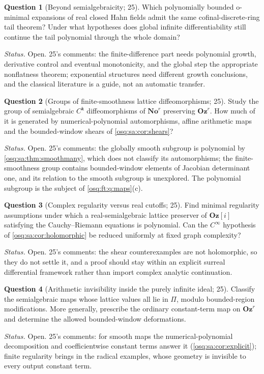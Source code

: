 \documentclass[11pt,letterpaper]{article}
\numberwithin{equation}{section}
\theoremstyle{definition}
\newtheorem{question}[question]{Question}
\theoremstyle{remark}
\theoremstyle{plain}
\newcommand{\No}{\mathbf{No}}
\newcommand{\Oz}{\mathbf{Oz}}
\newcommand{\GOz}{\Oz[i]}
\begin{document}
\begin{question}[Beyond semialgebraicity; 25]\label{osq:sa:q:ominimal}
Which polynomially bounded o-minimal expansions of real closed Hahn fields admit the same cofinal-discrete-ring tail theorem? Under what hypotheses does
global infinite differentiability still continue the tail polynomial through the whole domain?
\end{question}
\emph{Status.} Open. 25's comments: the finite-difference part needs polynomial growth, derivative control and eventual monotonicity, and the global step
the appropriate nonflatness theorem; exponential structures need different growth conclusions, and the classical literature \cite{JTW,BMRW} is a guide,
not an automatic transfer.

\begin{question}[Groups of finite-smoothness lattice diffeomorphisms; 25]\label{osq:sa:q:groups}
Study the group of semialgebraic $C^{\mathsf k}$ diffeomorphisms of $\No^r$ preserving $\Oz^r$. How much of it is generated by numerical-polynomial
automorphisms, affine arithmetic maps and the bounded-window shears of \cref{osq:sa:cor:shears}?
\end{question}
\emph{Status.} Open. 25's comments: the globally smooth subgroup is polynomial by \cref{osq:sa:thm:smoothmany}, which does not classify its
automorphisms; the finite-smoothness group contains bounded-window elements of Jacobian determinant one, and its relation to the smooth subgroup is
unexplored. The polynomial subgroup is the subject of \cref{osq:ft:q:maps}(c).

\begin{question}[Complex regularity versus real cutoffs; 25]\label{osq:sa:q:complex}
Find minimal regularity assumptions under which a real-semialgebraic lattice preserver of $\GOz$ satisfying the Cauchy--Riemann equations is polynomial.
Can the $C^\infty$ hypothesis of \cref{osq:sa:cor:holomorphic} be reduced uniformly at fixed graph complexity?
\end{question}
\emph{Status.} Open. 25's comments: the shear counterexamples are not holomorphic, so they do not settle it, and a proof should stay within an explicit
surreal differential framework rather than import complex analytic continuation.

\begin{question}[Arithmetic invisibility inside the purely infinite ideal; 25]\label{osq:sa:q:invisibility}
Classify the semialgebraic maps whose lattice values all lie in $\Pi$, modulo bounded-region modifications. More generally, prescribe the ordinary
constant-term map on $\Oz^r$ and determine the allowed bounded-window deformations.
\end{question}
\emph{Status.} Open. 25's comments: for smooth maps the numerical-polynomial decomposition and coefficientwise constant terms answer it
(\cref{osq:sa:cor:explicit}); finite regularity brings in the radical examples, whose geometry is invisible to every output constant term.
\end{document}
